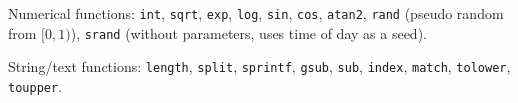 Numerical functions: \texttt{int}, \texttt{sqrt}, \texttt{exp}, \texttt{log}, \texttt{sin}, \texttt{cos}, \texttt{atan2}, \texttt{rand} (pseudo random from $[0, 1)$), \texttt{srand} (without parameters, uses time of day as a seed).

String/text functions: \texttt{length}, \texttt{split}, \texttt{sprintf}, \texttt{gsub}, \texttt{sub}, \texttt{index}, \texttt{match}, \texttt{tolower}, \texttt{toupper}.